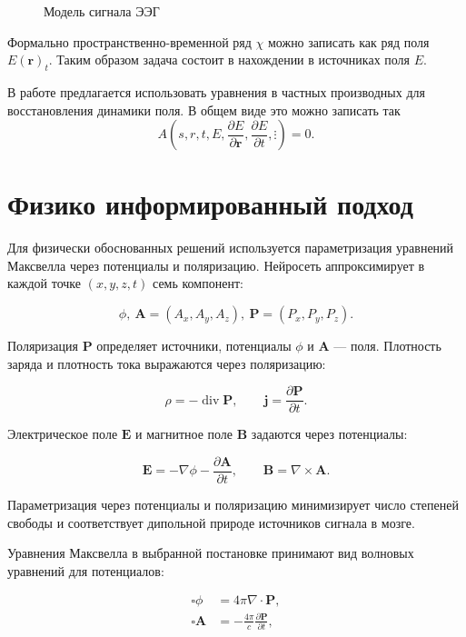 \documentclass[sn-mathphys-num]{bst/sn-jnl}
\theoremstyle{thmstylethree}
\theoremstyle{thmstyletwo}
\theoremstyle{thmstyleone}
\begin{document}
\begin{figure}[H]
\centerline{
}
\caption{Модель сигнала ЭЭГ}
\label{fig: LNN}
\end{figure}

Формально пространственно-временной ряд $\chi$ можно записать как ряд поля $E(\mathbf{r})_t$. Таким образом задача состоит в нахождении в источниках поля $E$. 

В работе предлагается использовать уравнения в частных производных для восстановления динамики поля. В общем виде это можно записать так
$$A\left(s, r, t, E, \frac{\partial E}{\partial{\mathbf{r}}}, \frac{\partial E}{\partial{t}}, \vdots \right)= 0.$$
\section{Физико информированный подход}
Для физически обоснованных решений используется параметризация уравнений Максвелла через потенциалы и поляризацию. Нейросеть аппроксимирует в каждой точке $(x,y,z,t)$ семь компонент:

\[\phi,\ \mathbf{A}=(A_x,A_y,A_z),\ \mathbf{P}=(P_x,P_y,P_z).\]

Поляризация $\mathbf{P}$ определяет источники, потенциалы $\phi$ и $\mathbf{A}$ --- поля. Плотность заряда и плотность тока выражаются через поляризацию:

\begin{equation}
    \rho = -\operatorname{div} \mathbf{P},
    \qquad
    \mathbf{j} = \frac{\partial \mathbf{P}}{\partial t}.
\end{equation}

Электрическое поле $\mathbf{E}$ и магнитное поле $\mathbf{B}$ задаются через потенциалы:

\begin{equation}
    \mathbf{E} = -\nabla \phi - \frac{\partial \mathbf{A}}{\partial t},
    \qquad
    \mathbf{B} = \nabla \times \mathbf{A}.
\end{equation}

Параметризация через потенциалы и поляризацию минимизирует число степеней свободы и соответствует дипольной природе источников сигнала в мозге.

Уравнения Максвелла в выбранной постановке принимают вид волновых уравнений для потенциалов:

\begin{align}
    \square \phi &= 4\pi \nabla \cdot \mathbf{P}, \label{eq:wave_phi} \\
    \square \mathbf{A} &= -\frac{4\pi}{c} \frac{\partial \mathbf{P}}{\partial t}, \label{eq:wave_A}
\end{align}
\end{document}
